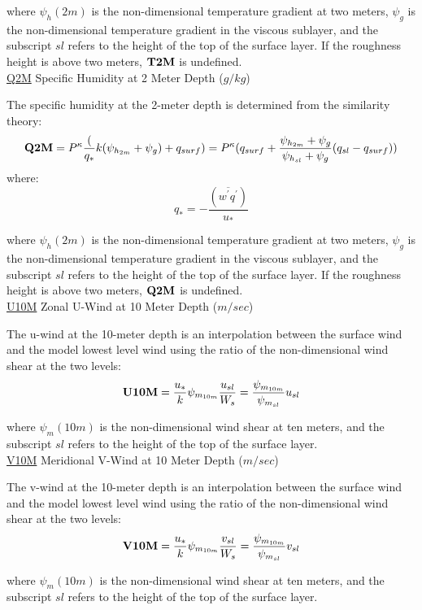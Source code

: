 \noindent
where $\psi_h(2m)$ is the non-dimensional temperature gradient at two meters, $\psi_g$ is
the non-dimensional temperature gradient in the viscous sublayer, and the subscript
$sl$ refers to the height of the top of the surface layer. If the roughness height
is above two meters, ${\bf T2M}$ is undefined.
\\
 
\noindent
{ \underline {Q2M}  Specific Humidity at 2 Meter Depth ($g/kg$) }

\noindent
The specific humidity at the 2-meter depth is determined from the similarity theory:
\[
{\bf Q2M} = P^{\kappa} \frac({q_*}{k} ({\psi_{h_{2m}}+\psi_g}) + q_{surf} ) = 
P^{\kappa}(q_{surf} + \frac{ \psi_{h_{2m}}+\psi_g }{ \psi_{h_{sl}}+\psi_g }
(q_{sl} - q_{surf})) 
\]
where:
\[
q_* = - \frac{ (\overline{w^{\prime}q^{\prime}}) }{ u_* }
\]

\noindent
where $\psi_h(2m)$ is the non-dimensional temperature gradient at two meters, $\psi_g$ is
the non-dimensional temperature gradient in the viscous sublayer, and the subscript
$sl$ refers to the height of the top of the surface layer. If the roughness height
is above two meters, ${\bf Q2M}$ is undefined.
\\
 
\noindent
{ \underline {U10M}  Zonal U-Wind at 10 Meter Depth ($m/sec$) }

\noindent
The u-wind at the 10-meter depth is an interpolation between the surface wind
and the model lowest level wind using the ratio of the non-dimensional wind shear
at the two levels:
\[
{\bf U10M} = \frac{u_*}{k} \psi_{m_{10m}} \frac{u_{sl}}{W_s} =
\frac{ \psi_{m_{10m}} }{ \psi_{m_{sl}} }u_{sl}
\]

\noindent
where $\psi_m(10m)$ is the non-dimensional wind shear at ten meters, and the subscript
$sl$ refers to the height of the top of the surface layer.
\\
 
\noindent
{ \underline {V10M}  Meridional V-Wind at 10 Meter Depth ($m/sec$) }

\noindent
The v-wind at the 10-meter depth is an interpolation between the surface wind
and the model lowest level wind using the ratio of the non-dimensional wind shear
at the two levels:
\[
{\bf V10M} = \frac{u_*}{k} \psi_{m_{10m}} \frac{v_{sl}}{W_s} =
\frac{ \psi_{m_{10m}} }{ \psi_{m_{sl}} }v_{sl}
\]

\noindent
where $\psi_m(10m)$ is the non-dimensional wind shear at ten meters, and the subscript
$sl$ refers to the height of the top of the surface layer.
\\
 

